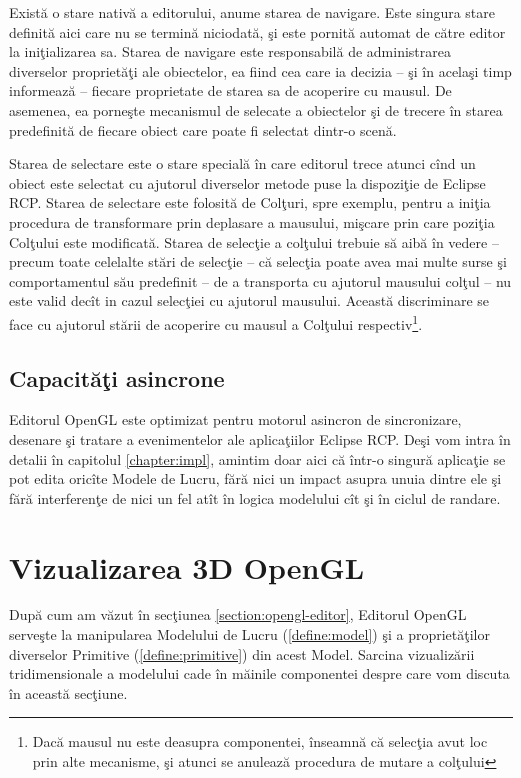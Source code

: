Există o stare nativă a editorului, anume starea de navigare. Este singura stare
definită aici care nu se termină niciodată, şi este pornită automat de către
editor la iniţializarea sa. Starea de navigare este responsabilă de
administrarea diverselor proprietăţi ale obiectelor, ea fiind cea care ia
decizia -- şi în acelaşi timp informează -- fiecare proprietate de starea sa de
acoperire cu mausul. De asemenea, ea porneşte mecanismul de selecate a
obiectelor şi de trecere în starea predefinită de fiecare obiect care poate fi
selectat dintr-o scenă.

Starea de selectare este o stare specială în care editorul trece atunci cînd un
obiect este selectat cu ajutorul diverselor metode puse la dispoziţie de Eclipse
RCP. Starea de selectare este folosită de Colţuri, spre exemplu, pentru a iniţia
procedura de transformare prin deplasare a mausului, mişcare prin care poziţia
Colţului este modificată. Starea de selecţie a colţului trebuie să aibă în
vedere -- precum toate celelalte stări de selecţie -- că selecţia poate avea mai
multe surse şi comportamentul său predefinit -- de a transporta cu ajutorul
mausului colţul -- nu este valid decît in cazul selecţiei cu ajutorul mausului.
Această discriminare se face cu ajutorul stării de acoperire cu mausul a
Colţului respectiv\footnote{Dacă mausul nu este deasupra componentei, înseamnă
că selecţia avut loc prin alte mecanisme, şi atunci se anulează procedura de
mutare a colţului}.

\subsection{Capacităţi asincrone}

Editorul OpenGL este optimizat pentru motorul asincron de sincronizare, 
desenare şi tratare a evenimentelor ale aplicaţiilor Eclipse RCP. Deşi vom 
intra în detalii în capitolul \ref{chapter:impl}, amintim doar aici că într-o 
singură aplicaţie se pot edita oricîte Modele de Lucru, fără nici un impact 
asupra unuia dintre ele şi fără interferenţe de nici un fel atît în logica 
modelului cît şi în ciclul de randare.

\section{Vizualizarea 3D OpenGL}
\label{section:view}

După cum am văzut în secţiunea \ref{section:opengl-editor}, Editorul OpenGL 
serveşte la manipularea Modelului de Lucru (\ref{define:model}) şi a 
proprietăţilor diverselor Primitive (\ref{define:primitive}) din acest Model. 
Sarcina vizualizării tridimensionale a modelului cade în măinile componentei 
despre care vom discuta în această secţiune.

